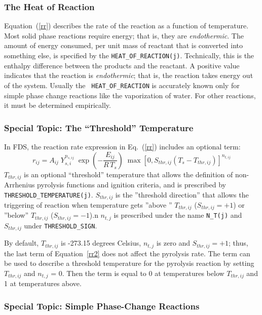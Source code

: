 \documentclass[11pt]{book}
\newcommand{\ct}{\tt\small}
\newcommand{\be}{\begin{equation}}
\newcommand{\ee}{\end{equation}}
\begin{document}
\subsubsection{The Heat of Reaction}

Equation~(\ref{rr}) describes the rate of the reaction as a function
of temperature.  Most solid phase reactions require energy; that is,
they are {\em endothermic}. The amount of energy consumed, per unit
mass of reactant that is converted into something else, is specified
by the {\ct HEAT\_OF\_REACTION(j)}. Technically, this is the enthalpy
difference between the products and the reactant. A positive value
indicates that the reaction is {\em endothermic}; that is, the
reaction takes energy out of the system. Usually the {\ct
HEAT\_OF\_REACTION} is accurately known only for simple phase change
reactions like the vaporization of water. For other reactions, it must
be determined empirically.


\subsubsection{Special Topic: The ``Threshold'' Temperature}

In FDS, the reaction rate expression in Eq.~(\ref{rr}) includes an optional term:
\be
  r_{ij} = A_{ij} \; Y_{s,i}^{n_{s,ij}} \; \exp \left(-\frac{E_{ij}}{R \, T_s} \right) \;
  \max\left[0,S_{thr,ij}(T_s-T_{thr,ij})\right]^{n_{t,ij}}
  \label{rr2}
\ee
$T_{thr,ij}$ is an optional ``threshold'' temperature that
allows the definition of non-Arrhenius pyrolysis functions and
ignition criteria, and is prescribed by {\ct THRESHOLD\_TEMPERATURE(j)}.
$S_{thr,ij}$ is the ''threshold direction'' that allows the triggering of reaction
when temperature gets ''above '' $T_{thr,ij}$ ($S_{thr,ij}=+1$) or ''below'' $T_{thr,ij}$ ($S_{thr,ij}=-1$).n
$n_{t,j}$ is prescribed under the name {\ct N\_T(j)} and $S_{thr,ij}$ under {\ct THRESHOLD\_SIGN}.

By default, $T_{thr,ij}$ is -273.15 degrees Celsius, $n_{t,j}$ is zero and $S_{thr,ij}=+1$;
thus, the last term of Equation~\ref{rr2} does not affect the pyrolysis rate.
The term can be used to describe a threshold temperature for the pyrolysis
reaction by setting $T_{thr,ij}$ and $n_{t,j}$ = 0. Then the term
is equal to 0 at temperatures below $T_{thr,ij}$ and 1 at temperatures above.

\subsubsection{Special Topic: Simple Phase-Change Reactions}
\end{document}
